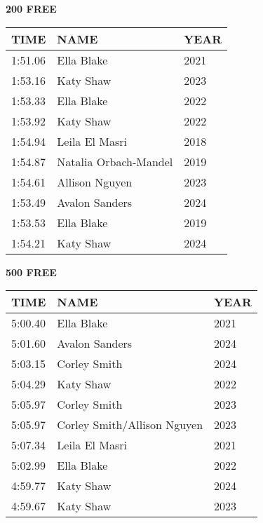 \begin{table}[H]
\centering
\begin{minipage}[t]{0.48\textwidth}
\centering
\textbf{200 FREE}\\[0.1cm]
\begin{tabular}{@{}p{1.8cm}p{2.8cm}p{1.2cm}@{}}
\hline
    \textbf{TIME} & \textbf{NAME} & \textbf{YEAR} \\
\hline
    1:51.06 & Ella Blake & 2021 \\
    1:53.16 & Katy Shaw & 2023 \\
    1:53.33 & Ella Blake & 2022 \\
    1:53.92 & Katy Shaw & 2022 \\
    1:54.94 & Leila El Masri & 2018 \\
    1:54.87 & Natalia Orbach-Mandel & 2019 \\
    1:54.61 & Allison Nguyen & 2023 \\
    1:53.49 & Avalon Sanders & 2024 \\
    1:53.53 & Ella Blake & 2019 \\
    1:54.21 & Katy Shaw & 2024 \\
\hline
\end{tabular}
\end{minipage}\hfill
\begin{minipage}[t]{0.48\textwidth}
\centering
\textbf{500 FREE}\\[0.1cm]
\begin{tabular}{@{}p{1.8cm}p{2.8cm}p{1.2cm}@{}}
\hline
    \textbf{TIME} & \textbf{NAME} & \textbf{YEAR} \\
\hline
    5:00.40 & Ella Blake & 2021 \\
    5:01.60 & Avalon Sanders & 2024 \\
    5:03.15 & Corley Smith & 2024 \\
    5:04.29 & Katy Shaw & 2022 \\
    5:05.97 & Corley Smith & 2023 \\
    5:05.97 & Corley Smith/Allison Nguyen & 2023 \\
    5:07.34 & Leila El Masri & 2021 \\
    5:02.99 & Ella Blake & 2022 \\
    4:59.77 & Katy Shaw & 2024 \\
    4:59.67 & Katy Shaw & 2023 \\
\hline
\end{tabular}
\end{minipage}
\end{table}

